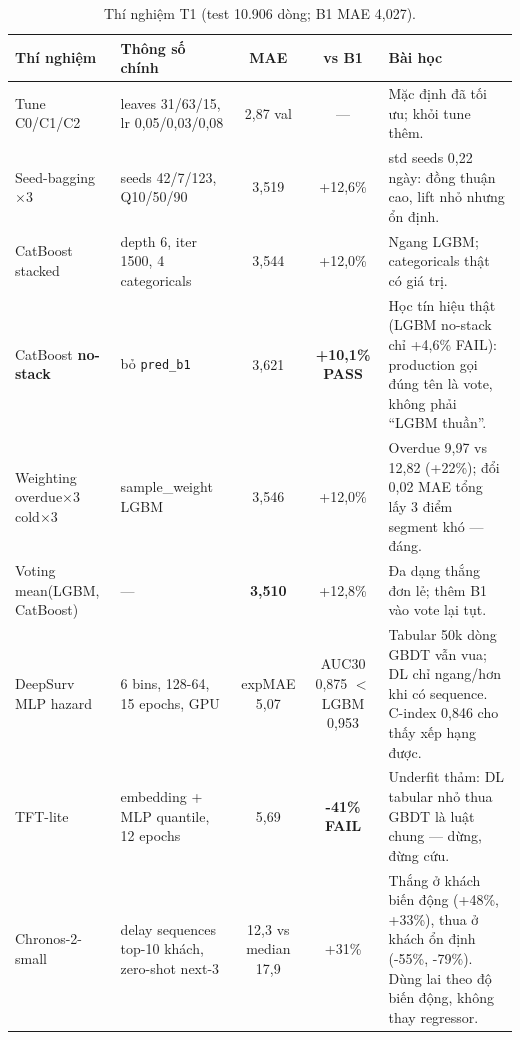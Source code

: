 \documentclass[12pt,a4paper]{article}
\begin{document}
\begin{table}[h]\centering
\caption{Thí nghiệm T1 (test 10.906 dòng; B1 MAE 4,027).}
\label{tab:t1exp}
\begin{tabular}{lp{5cm}ccp{4.5cm}}\toprule
Thí nghiệm & Thông số chính & MAE & vs B1 & Bài học \\\midrule
Tune C0/C1/C2 & leaves 31/63/15, lr 0,05/0,03/0,08 & 2,87 val & --- &
Mặc định đã tối ưu; khỏi tune thêm. \\
Seed-bagging $\times$3 & seeds 42/7/123, Q10/50/90 & 3,519 & +12,6\% &
std seeds 0,22 ngày: đồng thuận cao, lift nhỏ nhưng ổn định. \\
CatBoost stacked & depth 6, iter 1500, 4 categoricals & 3,544 & +12,0\% &
Ngang LGBM; categoricals thật có giá trị. \\
CatBoost \textbf{no-stack} & bỏ \texttt{pred\_b1} & 3,621 & \textbf{+10,1\% PASS} &
Học tín hiệu thật (LGBM no-stack chỉ +4,6\% FAIL): production gọi đúng tên là vote, không phải ``LGBM thuần''. \\
Weighting overdue$\times$3 cold$\times$3 & sample\_weight LGBM & 3,546 & +12,0\% &
Overdue 9,97 vs 12,82 (+22\%); đổi 0,02 MAE tổng lấy 3 điểm segment khó --- đáng. \\
Voting mean(LGBM, CatBoost) & --- & \textbf{3,510} & +12,8\% &
Đa dạng thắng đơn lẻ; thêm B1 vào vote lại tụt. \\
DeepSurv MLP hazard & 6 bins, 128-64, 15 epochs, GPU & expMAE 5,07 &
AUC30 0,875 $<$ LGBM 0,953 &
Tabular 50k dòng GBDT vẫn vua; DL chỉ ngang/hơn khi có sequence. C-index 0,846 cho thấy xếp hạng được. \\
TFT-lite & embedding + MLP quantile, 12 epochs & 5,69 & \textbf{-41\% FAIL} &
Underfit thảm: DL tabular nhỏ thua GBDT là luật chung --- dừng, đừng cứu. \\
Chronos-2-small & delay sequences top-10 khách, zero-shot next-3 &
12,3 vs median 17,9 & +31\% &
Thắng ở khách biến động (+48\%, +33\%), thua ở khách ổn định (-55\%, -79\%).
Dùng lai theo độ biến động, không thay regressor. \\\bottomrule
\end{tabular}
\end{table}
\end{document}
